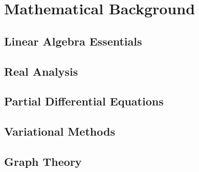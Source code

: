 \appendix

\chapter{Mathematical Background}
\label{app:math-background}


\section{Linear Algebra Essentials}


\section{Real Analysis}


\section{Partial Differential Equations}


\section{Variational Methods}


\section{Graph Theory}


\cleardoublepage
